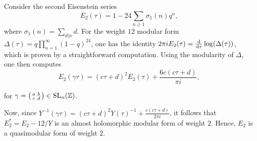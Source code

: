\begin{expl}

Consider the second Eisenstein series \[E_2(\tau)=1-24\sum_{n\geq1}\sigma_1(n)q^n,\] where $\sigma_1(n)=\sum_{d|n}d$. For the weight $12$ modular form $\Delta(\tau)=q\prod_{n=1}^{\infty}(1-q)^{24}$, one has the identity $2\pi iE_2(\tau)=\frac{\mathrm{d}}{\mathrm{d}\tau}\log(\Delta(\tau))$, which is proven by a straightforward computation. Using the modularity of $\Delta$, one then computes \[E_2(\gamma\tau)=(c\tau+d)^2 E_2(\tau) + \frac{6c(c\tau+d)}{\pi i},\]

for $\gamma=
 \bigl(\begin{smallmatrix}
 a&b\\ c&d
 \end{smallmatrix} \bigr)
 \in \operatorname{SL}_n(\mathbb{Z})$.

Now, since $Y^{-1}(\gamma\tau)=(c\tau+d)^2Y(\tau)^{-1}+\frac{c(c\tau+d)}{2\pi i}$, it follows that $E_2^*=E_2-12/Y$ is an almost holomorphic modular form of weight $2$. Hence, $E_2$ is a quasimodular form of weight $2$.

\end{expl}

